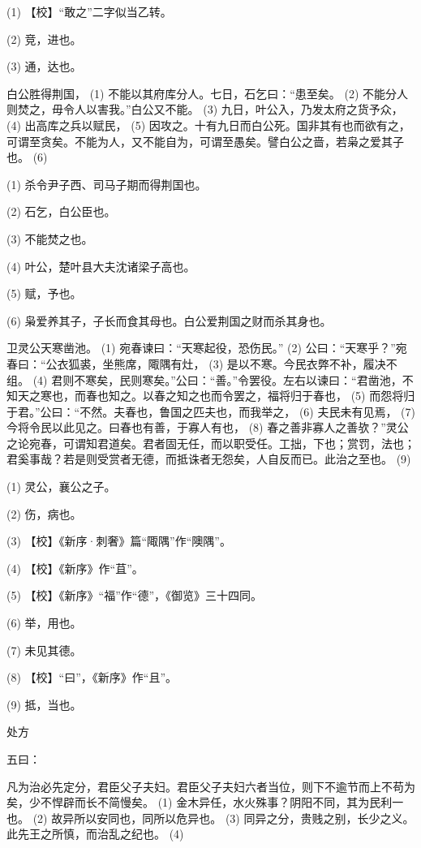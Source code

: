 \documentclass[12pt,UTF8]{ctexbook}
\begin{document}
(1) 【校】“敢之”二字似当乙转。

(2) 竞，进也。

(3) 通，达也。

白公胜得荆国， (1) 不能以其府库分人。七日，石乞曰：“患至矣。 (2) 不能分人则焚之，毋令人以害我。”白公又不能。 (3) 九日，叶公入，乃发太府之货予众， (4) 出高库之兵以赋民， (5) 因攻之。十有九日而白公死。国非其有也而欲有之，可谓至贪矣。不能为人，又不能自为，可谓至愚矣。譬白公之啬，若枭之爱其子也。 (6)

(1) 杀令尹子西、司马子期而得荆国也。

(2) 石乞，白公臣也。

(3) 不能焚之也。

(4) 叶公，楚叶县大夫沈诸梁子高也。

(5) 赋，予也。

(6) 枭爱养其子，子长而食其母也。白公爱荆国之财而杀其身也。

卫灵公天寒凿池。 (1) 宛春谏曰：“天寒起役，恐伤民。” (2) 公曰：“天寒乎？”宛春曰：“公衣狐裘，坐熊席，陬隅有灶， (3) 是以不寒。今民衣弊不补，履决不组。 (4) 君则不寒矣，民则寒矣。”公曰：“善。”令罢役。左右以谏曰：“君凿池，不知天之寒也，而春也知之。以春之知之也而令罢之，福将归于春也， (5) 而怨将归于君。”公曰：“不然。夫春也，鲁国之匹夫也，而我举之， (6) 夫民未有见焉， (7) 今将令民以此见之。曰春也有善，于寡人有也， (8) 春之善非寡人之善欤？”灵公之论宛春，可谓知君道矣。君者固无任，而以职受任。工拙，下也；赏罚，法也；君奚事哉？若是则受赏者无德，而抵诛者无怨矣，人自反而已。此治之至也。 (9)

(1) 灵公，襄公之子。

(2) 伤，病也。

(3) 【校】《新序·刺奢》篇“陬隅”作“隩隅”。

(4) 【校】《新序》作“苴”。

(5) 【校】《新序》“福”作“德”，《御览》三十四同。

(6) 举，用也。

(7) 未见其德。

(8) 【校】“曰”，《新序》作“且”。

(9) 抵，当也。





处方


五曰：

凡为治必先定分，君臣父子夫妇。君臣父子夫妇六者当位，则下不逾节而上不苟为矣，少不悍辟而长不简慢矣。 (1) 金木异任，水火殊事？阴阳不同，其为民利一也。 (2) 故异所以安同也，同所以危异也。 (3) 同异之分，贵贱之别，长少之义。此先王之所慎，而治乱之纪也。 (4)
\end{document}

